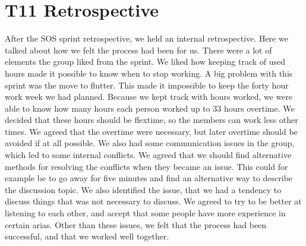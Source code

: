 \section{T11 Retrospective}
After the SOS sprint retrospective, we held an internal retrospective. 
Here we talked about how we felt the process had been for us. 
There were a lot of elements the group liked from the sprint. 
We liked how keeping track of used hours made it possible to know when to stop working. 
A big problem with this sprint was the move to flutter. This made it impossible to keep the forty hour work week we had planned. 
Because we kept track with hours worked, we were able to know how many hours each person worked up to 33 hours overtime. We decided that these hours should be flextime, so the members can work less other times. 
We agreed that the overtime were necessary, but later overtime should be avoided if at all possible.
We also had some communication issues in the group, which led to some internal conflicts. We agreed that we should find alternative methods for resolving the conflicts when they became an issue. This could for example be to go away for five minutes and find an alternative way to describe the discussion topic. 
We also identified the issue, that we had a tendency to discuss things that was not necessary to discuss. We agreed to try to be better at listening to each other, and accept that some people have more experience in certain arias. 
Other than these issues, we felt that the process had been successful, and that we worked well together. 